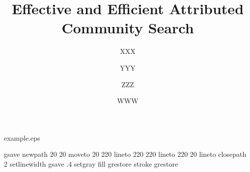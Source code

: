 \begin{filecontents*}{example.eps}

gsave
newpath
  20 20 moveto
  20 220 lineto
  220 220 lineto
  220 20 lineto
closepath
2 setlinewidth
gsave
  .4 setgray fill
grestore
stroke
grestore
\end{filecontents*}
%
\RequirePackage{fix-cm}
%
\documentclass[twocolumn]{svjour3}          %
%
\smartqed  %
%

\let\proof\relax 
\let\endproof\relax

\usepackage{graphicx}
\usepackage{balance}
\usepackage{color}
\usepackage[noend]{algpseudocode}
\usepackage{algorithm}
\usepackage{varwidth}
\usepackage{url}
\usepackage{multirow}
\usepackage{subfigure}
\usepackage{mathtools}
\usepackage{amsmath,bm}
\usepackage{hyperref}
\usepackage{amsthm}

\usepackage{indentfirst}

\renewcommand{\arraystretch}{1.18}

\newtheorem{variant}{Variant}

\newcommand{\fang}[1]{{\color{red}[\textbf{Yixiang:} #1]}}
\newcommand{\rey}[1]{{\color{blue}[\textbf{Reynold:} #1]}}
\newcommand{\luo}[1]{{\color{purple}[\textbf{Siqiang:} #1]}}
\newcommand{\hu}[1]{{\color{green}[\textbf{Jiafeng:} #1]}}
\newcommand{\chen}[1]{{\color{blue}[\textbf{Yankai:} #1]}}

\newcommand{\tabincell}[2]{\begin{tabular}{@{}#1@{}}#2\end{tabular}}





\title{Effective and Efficient Attributed Community Search}


\author{XXX         \and
        YYY        \and
        ZZZ          \and
        WWW
}

